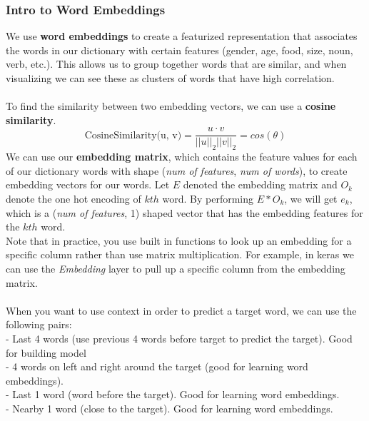 \documentclass[11pt, a4paper]{article}
\begin{document}
\begin{spacing}{1.1}
	\subsubsection{Intro to Word Embeddings}
	We use \textbf{word embeddings} to create a featurized representation that associates the words in our dictionary with certain features (gender, age, food, size, noun, verb, etc.). This allows us to group together words that are similar, and when visualizing we can see these as clusters of words that have high correlation. \\~\\	
	To find the similarity between two embedding vectors, we can use a \textbf{cosine similarity}. $$\text{CosineSimilarity(u, v)} = \frac {u \cdot v} {||u||_2 ||v||_2} = cos(\theta)$$
	We can use our \textbf{embedding matrix}, which contains the feature values for each of our dictionary words with shape (\textit{num of features}, \textit{num of words}), to create embedding vectors for our words. Let $E$ denoted the embedding matrix and $O_k$ denote the one hot encoding of $kth$ word. By performing $E * O_k$, we will get $e_k$, which is a (\textit{num of features}, 1) shaped vector that has the embedding features for the $kth$ word. \vspace*{2mm}\\
	Note that in practice, you use built in functions to look up an embedding for a specific column rather than use matrix multiplication. For example, in keras we can use the \textit{Embedding} layer to pull up a specific column from the embedding matrix. \\~\\
	When you want to use context in order to predict a target word, we can use the following pairs: \\
	- Last 4 words (use previous 4 words before target to predict the target). Good for building model \\
	- 4 words on left and right around the target (good for learning word embeddings).\\
	- Last 1 word (word before the target). Good for learning word embeddings.\\
	- Nearby 1 word (close to the target). Good for learning word embeddings.
	

\end{spacing}
\end{document}
